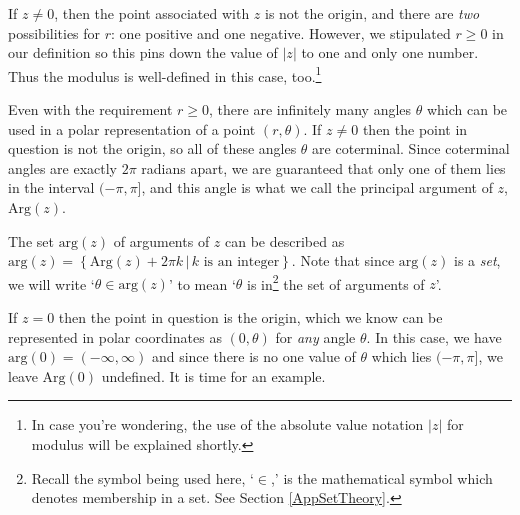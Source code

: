 \documentclass{ximera}
\begin{document}
 

 If $z \neq 0$, then the point associated with $z$ is not the origin, and there are \textit{two} possibilities for $r$:  one positive and one negative.  However, we stipulated $r \geq 0$ in our definition so this pins down the value of $|z|$ to one and only one number. Thus the modulus is well-defined in this case, too.\footnote{In case you're wondering, the use of the absolute value notation $|z|$ for modulus will be explained shortly.} 

 

Even with the requirement $r \geq 0$,  there are infinitely many angles $\theta$ which can be used in a polar representation of a point $(r,\theta)$. If $z \neq 0$ then the point in question is not the origin, so all of these angles $\theta$ are coterminal.  Since coterminal angles are exactly $2\pi$ radians apart, we are guaranteed that only one of them lies in the interval $(-\pi, \pi]$, and this angle is what we call the principal argument of $z$, $\text{Arg}(z)$.

 

The set $\text{arg}(z)$ of  arguments of $z$ can be described as $\text{arg}(z) = \left\{ \text{Arg}(z) + 2\pi k \, | \, \text{$k$ is an integer} \right\}$.  Note that since $\text{arg}(z)$ is a \textit{set}, we will write `$\theta \in \text{arg}(z)$' to mean `$\theta$ is in\footnote{Recall the symbol being used here, `$\in$,' is the mathematical symbol which denotes membership in a set.  See Section \ref{AppSetTheory}.}  the set of arguments of $z$'.   

 

If $z=0$ then the point in question is the origin, which we know can be represented in polar coordinates as $(0,\theta)$ for \textit{any} angle $\theta$. In this case, we have $\text{arg}(0) = (-\infty, \infty)$ and since there is no one value of $\theta$ which lies $(-\pi, \pi]$, we leave $\text{Arg}(0)$ undefined. It is time for an example.
\end{document}
